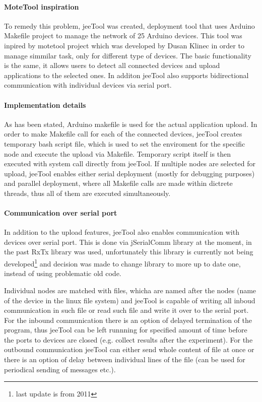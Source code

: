 \documentclass[
  digital, %
  table,   %
  nolof,     %
  nolot,     %
           oneside
]{fithesis3}
\begin{document}
\paragraph{MoteTool inspiration}
  To remedy this problem, jeeTool \cite{JeeTool}
  was created, deployment tool that uses Arduino Makefile project \cite{ArduinoMK}
  to manage the network of 25 Arduino devices. This tool was inpired by motetool project \cite{motetool}
  which was developed by Dusan Klinec in order to manage simmilar task, only for different type of devices. The basic functionality is the same, it allows users to detect all connected devices and upload applications to the selected ones. In additon jeeTool also supports bidirectional communication with individual devices via serial port.

\paragraph{Implementation details}
  As has been stated, Arduino makefile is used for the actual application upload. In order to make Makefile call for each of the connected devices, jeeTool creates temporary bash script file, which is used to set the enviroment for the specific node and execute the upload via Makefile. Temporary script itself is then executed with system call directly from jeeTool. If multiple nodes are selected for upload, jeeTool enables either serial deployment (mostly for debugging purposes) and parallel deployment, where all Makefile calls are made within dictrete threads, thus all of them are executed simultaneously.

\paragraph{Communication over serial port}
  In addition to the upload features, jeeTool also enables communication with devices over serial port. This is done via jSerialComm library \cite{jserial}
  at the moment, in the past RxTx library \cite{rxtx}
  was used, unfortunately this library is currently not being developed\footnote{last update is from 2011} and decision was made to change library to more up to date one, instead of using problematic old code.

  Individual nodes are matched with files, whicha are named after the nodes (name of the device in the linux file system) and jeeTool is capable of writing all inboud communication in such file or read such file and write it over to the serial port. For the inbound communication there is an option of delayed termination of the program, thus jeeTool can be left runnning for specified amount of time before the ports to devices are closed (e.g. collect results after the experiment). For the outbound communication jeeTool can either send whole content of file at once or there is an option of delay between individual lines of the file (can be used for periodical sending of messages etc.).
\end{document}

